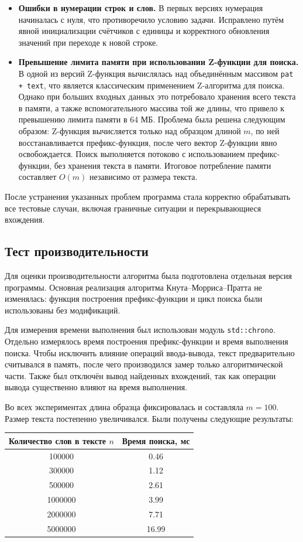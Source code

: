 \documentclass[12pt]{article}
\begin{document}
\begin{itemize}
	\item \textbf{Ошибки в нумерации строк и слов.}
	В первых версиях нумерация начиналась с нуля, что противоречило условию задачи. Исправлено путём явной инициализации счётчиков с единицы и корректного обновления значений при переходе к новой строке.

	\item \textbf{Превышение лимита памяти при использовании Z-функции для поиска.}
	В одной из версий Z-функция вычислялась над объединённым массивом \texttt{pat + text}, что является классическим применением Z-алгоритма для поиска. Однако при больших входных данных это потребовало хранения всего текста в памяти, а также вспомогательного массива той же длины, что привело к превышению лимита памяти в 64 МБ. Проблема была решена следующим образом: Z-функция вычисляется только над образцом длиной $m$, по ней восстанавливается префикс-функция, после чего вектор Z-функции явно освобождается. Поиск выполняется потоково с использованием префикс-функции, без хранения текста в памяти. Итоговое потребление памяти составляет $O(m)$ независимо от размера текста.
\end{itemize}

После устранения указанных проблем программа стала корректно обрабатывать все тестовые случаи, включая граничные ситуации и перекрывающиеся вхождения.

\subsection*{Тест производительности}

Для оценки производительности алгоритма была подготовлена отдельная версия программы. Основная реализация алгоритма Кнута--Морриса--Пратта не изменялась: функция построения префикс-функции и цикл поиска были использованы без модификаций.

Для измерения времени выполнения был использован модуль \texttt{std::chrono}. Отдельно измерялось время построения префикс-функции и время выполнения поиска. Чтобы исключить влияние операций ввода-вывода, текст предварительно считывался в память, после чего производился замер только алгоритмической части. Также был отключён вывод найденных вхождений, так как операции вывода существенно влияют на время выполнения.

Во всех экспериментах длина образца фиксировалась и составляла $m = 100$. Размер текста постепенно увеличивался. Были получены следующие результаты:

\begin{center}
	\begin{tabular}{|c|c|}
		\hline
		Количество слов в тексте $n$ & Время поиска, мс \\
		\hline
		100000 & 0.46 \\
		300000 & 1.12 \\
		500000 & 2.61 \\
		1000000 & 3.99 \\
		2000000 & 7.71 \\
		5000000 & 16.99 \\
		\hline
	\end{tabular}
\end{center}
\end{document}
